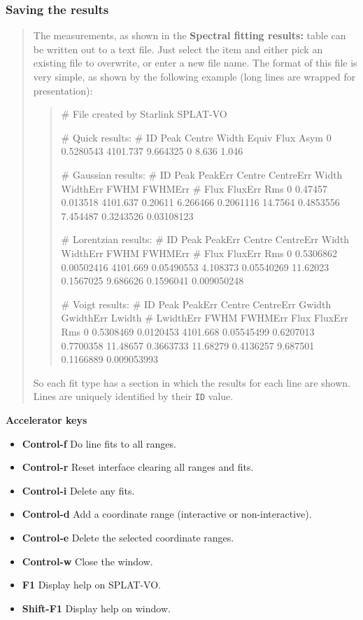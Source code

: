 \documentclass[twoside,11pt,nolof]{starlink}
\providecommand{\SPLAT}{\textsf{SPLAT-VO}}
\newcommand{\submenuitem}[2]{\latexhtml{\textbf{#1$\rightarrow$#2}}{\textbf{#1->#2}}}
\newcommand{\labelitem}[1]{\textbf{#1}}
\providecommand{\hitext}[1]{\texttt{#1}}
\providecommand{\subheading}[1]{\textbf{\large{#1}}}
\begin{document}
\subsubsection{Saving the results}
\begin{quote}
 The measurements, as shown in the \labelitem{Spectral fitting
 results:} table can be written out to a text file. Just select the
 \submenuitem{File}{Save line fits} item and either pick an existing file
 to overwrite, or enter a new file name. The format of this file is
 very simple, as shown by the following example (long lines are wrapped
 for presentation):
 \begin{quote}
  \begin{terminalv}

# File created by Starlink SPLAT-VO

# Quick results:
# ID Peak Centre Width Equiv Flux Asym
0 0.5280543 4101.737 9.664325 0 8.636 1.046

# Gaussian results:
# ID Peak PeakErr Centre CentreErr Width WidthErr FWHM FWHMErr
# Flux FluxErr Rms
0 0.47457 0.013518 4101.637 0.20611 6.266466 0.2061116 14.7564 0.4853556
7.454487 0.3243526 0.03108123

# Lorentzian results:
# ID Peak PeakErr Centre CentreErr Width WidthErr FWHM FWHMErr
# Flux FluxErr Rms
0 0.5306862 0.00502416 4101.669 0.05490553 4.108373 0.05540269 11.62023 0.1567025
9.686626 0.1596041 0.009050248

# Voigt results:
# ID Peak PeakErr Centre CentreErr Gwidth GwidthErr Lwidth
# LwidthErr FWHM FWHMErr Flux FluxErr Rms
0 0.5308469 0.0120453 4101.668 0.05545499 0.6207013 0.7700358 11.48657 0.3663733
11.68279 0.4136257 9.687501 0.1166889 0.009053993

  \end{terminalv}
 \end{quote}
 So each fit type has a section in which the results for each line are
 shown. Lines are uniquely identified by their \hitext{ID} value.
\end{quote}

\subheading{Accelerator keys}

\begin{itemize}
\item \labelitem{Control-f} Do line fits to all ranges.
\item \labelitem{Control-r} Reset interface clearing all ranges and fits.
\item \labelitem{Control-i} Delete any fits.

\item \labelitem{Control-d} Add a coordinate range (interactive or non-interactive).
\item \labelitem{Control-e} Delete the selected coordinate ranges.

\item \labelitem{Control-w} Close the window.
\item \labelitem{F1} Display help on \SPLAT.
\item \labelitem{Shift-F1} Display help on window.
\end{itemize}
\end{document}
